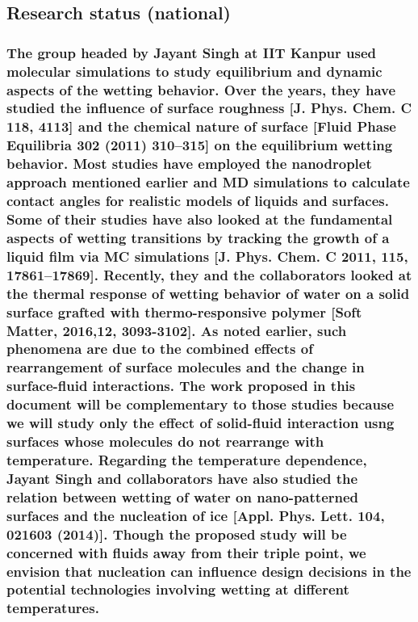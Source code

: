 \documentclass[a4paper,12pt,single,pdftex]{scrartcl}
\begin{document}
{\label{ID_374576713}\subsection{Research status (national)}

\label{ID_1169605654}\subsubsection{The group headed by Jayant Singh at IIT Kanpur used molecular simulations to study equilibrium and dynamic aspects of the wetting behavior. Over the years, they have studied the influence of surface roughness [J. Phys. Chem. C 118, 4113] and the chemical nature of surface [Fluid Phase Equilibria 302 (2011) 310–315] on the equilibrium wetting behavior. Most studies have employed the nanodroplet approach mentioned earlier and MD simulations to calculate contact angles for realistic models of liquids and surfaces. Some of their studies have also looked at the fundamental aspects of wetting transitions by tracking the growth of a liquid film via MC simulations [J. Phys. Chem. C 2011, 115, 17861–17869]. Recently, they and the collaborators looked at the thermal response of wetting behavior of water on a solid surface grafted with thermo-responsive polymer [Soft Matter, 2016,12, 3093-3102]. As noted earlier, such phenomena are due to the combined effects of rearrangement of surface molecules and the change in surface-fluid interactions. The work proposed in this document will be complementary to those studies because we will study only the effect of solid-fluid interaction usng surfaces whose molecules do not rearrange with temperature. Regarding the temperature dependence, Jayant Singh and collaborators have also studied the relation between wetting of water on nano-patterned surfaces and the nucleation of ice [Appl. Phys. Lett. 104, 021603 (2014)]. Though the proposed study will be concerned with fluids away from their triple point, we envision that nucleation can influence design decisions in the potential technologies involving wetting at different temperatures.}

}
\end{document}
